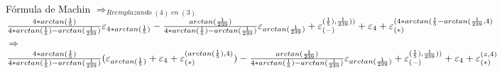 \begin{section}{Fórmula de Machin}
	$\Rightarrow_{Reemplazando \; (4) \; en \; (3)}$\\
	
	$\frac{4*arctan(\frac{1}{5})}{4*arctan(\frac{1}{5})-arctan(\frac{1}{239})}\varepsilon _{4*arctan(\frac{1}{5})} - \frac{arctan(\frac{1}{239})}{4*arctan(\frac{1}{5})-arctan(\frac{1}{239})}\varepsilon _{arctan(\frac{1}{239})} + \varepsilon _{({-})}^{({\frac{1}{5}),\frac{1}{239})})} + \varepsilon _{4} + \varepsilon _{({*})}^{({4*arctan(\frac{1}{5}-arctan(\frac{1}{239},4})}$\\
	
	$\Rightarrow$\\
	
	$\frac{4*arctan(\frac{1}{5})}{4*arctan(\frac{1}{5})-arctan(\frac{1}{239})}(\varepsilon _{arctan(\frac{1}{5})}+\varepsilon _{4}+\varepsilon _{({*})}^{({arctan(\frac{1}{5}),4})}) - \frac{arctan(\frac{1}{239})}{4*arctan(\frac{1}{5})-arctan(\frac{1}{239})}\varepsilon _{arctan(\frac{1}{239})} + \varepsilon _{({-})}^{({\frac{1}{5}),\frac{1}{239})})} + \varepsilon _{4} + \varepsilon _{({*})}^{({z,4})}$
\end{section}
